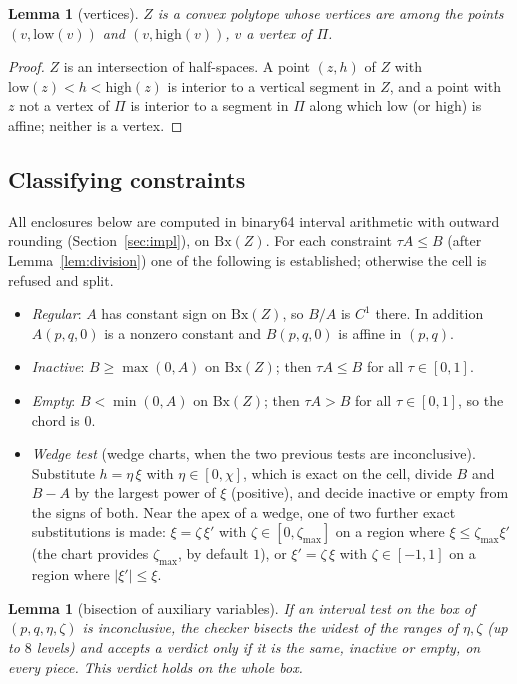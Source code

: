 \documentclass[11pt]{amsart}
\newtheorem{lemma}[theorem]{Lemma}
\theoremstyle{definition}
\theoremstyle{remark}
\newcommand{\low}{\mathrm{low}}
\newcommand{\high}{\mathrm{high}}
\newcommand{\Bx}{\mathrm{Bx}}
\begin{document}
\begin{lemma}[vertices]\label{lem:vertices}
$Z$ is a convex polytope whose vertices are among the points $(v,\low(v))$ and $(v,\high(v))$, $v$ a vertex of
$\Pi$.
\end{lemma}

\begin{proof}
$Z$ is an intersection of half-spaces. A point $(z,h)$ of $Z$ with $\low(z)<h<\high(z)$ is interior to a vertical
segment in $Z$, and a point with $z$ not a vertex of $\Pi$ is interior to a segment in $\Pi$ along which $\low$ (or
$\high$) is affine; neither is a vertex.
\end{proof}

\subsection{Classifying constraints}
All enclosures below are computed in binary64 interval arithmetic with outward rounding (Section~\ref{sec:impl}),
on $\Bx(Z)$. For each constraint $\tau A\le B$ (after Lemma~\ref{lem:division}) one of the following is established;
otherwise the cell is refused and split.
\begin{itemize}
\item \emph{Regular}: $A$ has constant sign on $\Bx(Z)$, so $B/A$ is $C^1$ there. In addition $A(p,q,0)$ is a nonzero
constant and $B(p,q,0)$ is affine in $(p,q)$.
\item \emph{Inactive}: $B\ge\max(0,A)$ on $\Bx(Z)$; then $\tau A\le B$ for all $\tau\in[0,1]$.
\item \emph{Empty}: $B<\min(0,A)$ on $\Bx(Z)$; then $\tau A>B$ for all $\tau\in[0,1]$, so the chord is $0$.
\item \emph{Wedge test} (wedge charts, when the two previous tests are inconclusive). Substitute $h=\eta\,\xi$ with
$\eta\in[0,\chi]$, which is exact on the cell, divide $B$ and $B-A$ by the largest power of $\xi$ (positive), and
decide inactive or empty from the signs of both. Near the apex of a wedge, one of two further exact substitutions is
made: $\xi=\zeta\,\xi'$ with $\zeta\in[0,\zeta_{\max}]$ on a region where $\xi\le\zeta_{\max}\xi'$ (the chart provides
$\zeta_{\max}$, by default $1$), or $\xi'=\zeta\,\xi$ with $\zeta\in[-1,1]$ on a region where $|\xi'|\le\xi$.
\end{itemize}

\begin{lemma}[bisection of auxiliary variables]\label{lem:bisect}
If an interval test on the box of $(p,q,\eta,\zeta)$ is inconclusive, the checker bisects the widest of the ranges of
$\eta,\zeta$ (up to $8$ levels) and accepts a verdict only if it is the same, inactive or empty, on every piece. This
verdict holds on the whole box.
\end{lemma}
\end{document}
